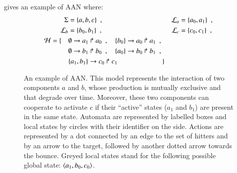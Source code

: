 \begin{example}
   gives an example of AAN where:
  \begin{align*}
    \Sigma &= \{ a, b, c \} \enspace,
      & \mathcal{L}_a &= \{ a_0, a_1 \} \enspace, \\
    \mathcal{L}_b &= \{ b_0, b_1 \} \enspace,
      & \mathcal{L}_c &= \{ c_0, c_1 \} \enspace, \\
    \mathcal{H} = \{ \quad
      & \emptyset\rightarrow a_1\Rsh a_0 \enspace , \quad
        \{b_0\}\rightarrow a_0\Rsh a_1 \enspace , \\
      & \emptyset\rightarrow b_1\Rsh b_0 \enspace , \quad
        \{a_0\}\rightarrow b_0\Rsh b_1 \enspace , \\
      & \{a_1, b_1\}\rightarrow c_0\Rsh c_1 \enspace \quad \qquad \qquad
      \quad \}
  \end{align*}

\begin{figure}[tb]
  \centering
  \caption{%
  \label{fig:ph-livelock}%
    An example of AAN.
    This model represents the interaction of two components $a$ and $b$,
    whose production is mutually exclusive and that degrade over time.
    Moreover, these two components can cooperate to activate $c$
    if their “active” states ($a_1$ and $b_1$)
    are present in the same state.
    Automata are represented by labelled boxes
    and local states by circles with their identifier on the side.
    Actions are represented by a dot connected by an edge to the set of hitters
    and by an arrow to the target, followed by another dotted arrow towards the bounce.
    Greyed local states stand for the following possible global state:
    $\mbox{$\langle a_1, b_0, c_0 \rangle$}$.
  }
\end{figure}

\end{example}

